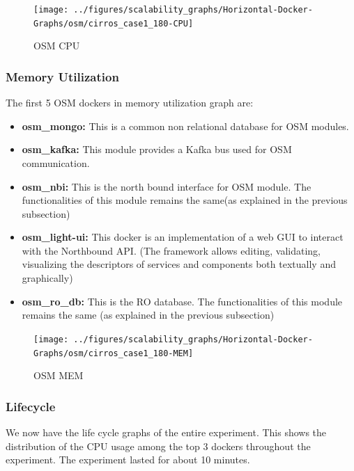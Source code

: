 \begin{figure}[h]
	\centering
	\texttt{[image: ../figures/scalability\_graphs/Horizontal-Docker-Graphs/osm/cirros\_case1\_180-CPU]}
	\caption{OSM CPU}
	\label{fig:cirroscase1180-cpu}
\end{figure}

\pagebreak



\subsubsection{Memory Utilization}

The first 5 OSM dockers in memory utilization graph are:

\begin{itemize}
	\item \textbf{osm\_mongo:} This is a common non relational database for OSM modules.
	\item \textbf{osm\_kafka:} This module provides a Kafka bus used for OSM communication.
	\item \textbf{osm\_nbi:} This is the north bound interface for OSM module. The functionalities of this module remains the same(as explained in the previous subsection)
	
	\item \textbf{osm\_light-ui:} This docker is an implementation of a web GUI to interact with the Northbound API. (The framework allows editing, validating, visualizing the descriptors of services and components both textually and graphically)
	\item \textbf{osm\_ro\_db:} This is the RO database. The functionalities of this module remains the same (as explained in the previous subsection)
	
\end{itemize}



\begin{figure}[h]
	\centering
	\texttt{[image: ../figures/scalability\_graphs/Horizontal-Docker-Graphs/osm/cirros\_case1\_180-MEM]}
	\caption{OSM MEM}
	\label{fig:cirroscase1180-mem}
\end{figure}


\subsubsection{Lifecycle}

We now have the life cycle graphs of the entire experiment. This shows the distribution of the CPU usage among the top 3 dockers throughout the experiment. The experiment lasted for about 10 minutes.

